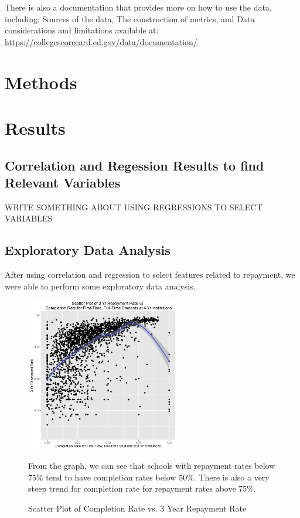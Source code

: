 \documentclass[a4paper]{article}\usepackage[]{graphicx}\usepackage[]{color}
\begin{document}
There is also a documentation that provides more on how to use the data, including: Sources of the data, The construction of metrics, and Data considerations and limitations available at: \url{https://collegescorecard.ed.gov/data/documentation/}

\section{Methods}\section{Results}

\subsection{Correlation and Regession Results to find Relevant Variables}
WRITE SOMETHING ABOUT USING REGRESSIONS TO SELECT VARIABLES 


\subsection{Exploratory Data Analysis}
After using correlation and regression to select features related to repayment, we were able to perform some exploratory data analysis. 

\begin{figure}
  \caption{Scatter Plot of Completion Rate vs. 3 Year Repayment Rate}
  \centering
  \includegraphics[width=0.6\textwidth]{../images/eda/complrt_rpy3yr_scatter.png}
  \centering
  \newline
  
  \raggedright
From the graph, we can see that schools with repayment rates below 75\% tend to have completion rates below 50\%. There is also a very steep trend for completion rate for repayment rates above 75\%. 
\end{figure}
 
\end{document}
